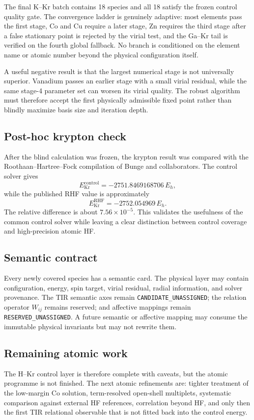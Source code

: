 The final K--Kr batch contains 18 species and all 18 satisfy the frozen control quality gate. The convergence ladder is genuinely adaptive: most elements pass the first stage, Co and Cu require a later stage, Zn requires the third stage after a false stationary point is rejected by the virial test, and the Ga--Kr tail is verified on the fourth global fallback. No branch is conditioned on the element name or atomic number beyond the physical configuration itself.

A useful negative result is that the largest numerical stage is not universally superior. Vanadium passes an earlier stage with a small virial residual, while the same stage-4 parameter set can worsen its virial quality. The robust algorithm must therefore accept the first physically admissible fixed point rather than blindly maximize basis size and iteration depth.

\subsection{Post-hoc krypton check}

After the blind calculation was frozen, the krypton result was compared with the Roothaan--Hartree--Fock compilation of Bunge and collaborators. The control solver gives
\begin{equation}
 E_{\mathrm{Kr}}^{\mathrm{control}}=-2751.8469168706\,E_h,
\end{equation}
while the published RHF value is approximately
\begin{equation}
 E_{\mathrm{Kr}}^{\mathrm{RHF}}=-2752.054969\,E_h.
\end{equation}
The relative difference is about $7.56\times10^{-5}$. This validates the usefulness of the common control solver while leaving a clear distinction between control coverage and high-precision atomic HF.

\subsection{Semantic contract}

Every newly covered species has a semantic card. The physical layer may contain configuration, energy, spin target, virial residual, radial information, and solver provenance. The TIR semantic axes remain \texttt{CANDIDATE\_UNASSIGNED}; the relation operator $W_{ij}$ remains reserved; and affective mappings remain \texttt{RESERVED\_UNASSIGNED}. A future semantic or affective mapping may consume the immutable physical invariants but may not rewrite them.

\subsection{Remaining atomic work}

The H--Kr control layer is therefore complete with caveats, but the atomic programme is not finished. The next atomic refinements are: tighter treatment of the low-margin Co solution, term-resolved open-shell multiplets, systematic comparison against external HF references, correlation beyond HF, and only then the first TIR relational observable that is not fitted back into the control energy.
